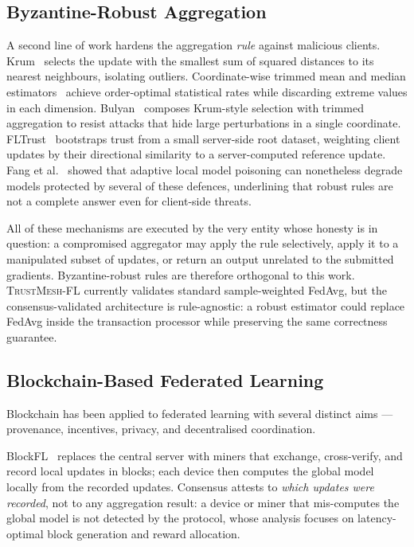 \documentclass[lettersize,journal]{IEEEtran}
\newcommand{\tmfl}{\textsc{TrustMesh-FL}}
\begin{document}
\subsection{Byzantine-Robust Aggregation}

A second line of work hardens the aggregation \emph{rule} against malicious clients.
Krum~\cite{blanchard2017machine} selects the update with the smallest sum of squared
distances to its nearest neighbours, isolating outliers. Coordinate-wise trimmed mean
and median estimators~\cite{yin2018byzantine} achieve order-optimal statistical rates
while discarding extreme values in each dimension. Bulyan~\cite{elMhamdi2018hidden}
composes Krum-style selection with trimmed aggregation to resist attacks that hide
large perturbations in a single coordinate. FLTrust~\cite{cao2020fltrust} bootstraps
trust from a small server-side root dataset, weighting client updates by their
directional similarity to a server-computed reference update. Fang et
al.~\cite{fang2020local} showed that adaptive local model poisoning can nonetheless
degrade models protected by several of these defences, underlining that robust rules
are not a complete answer even for client-side threats.

All of these mechanisms are executed by the very entity whose honesty is in question:
a compromised aggregator may apply the rule selectively, apply it to a manipulated
subset of updates, or return an output unrelated to the submitted gradients.
Byzantine-robust rules are therefore orthogonal to this work. \tmfl{} currently
validates standard sample-weighted FedAvg, but the consensus-validated architecture is
rule-agnostic: a robust estimator could replace FedAvg inside the transaction processor
while preserving the same correctness guarantee.

\subsection{Blockchain-Based Federated Learning}

Blockchain has been applied to federated learning with several distinct aims ---
provenance, incentives, privacy, and decentralised coordination.

BlockFL~\cite{kim2020blockchained} replaces the central server with miners that
exchange, cross-verify, and record local updates in blocks; each device then computes
the global model locally from the recorded updates. Consensus attests to \emph{which
updates were recorded}, not to any aggregation result: a device or miner that
mis-computes the global model is not detected by the protocol, whose analysis focuses
on latency-optimal block generation and reward allocation.
\end{document}
